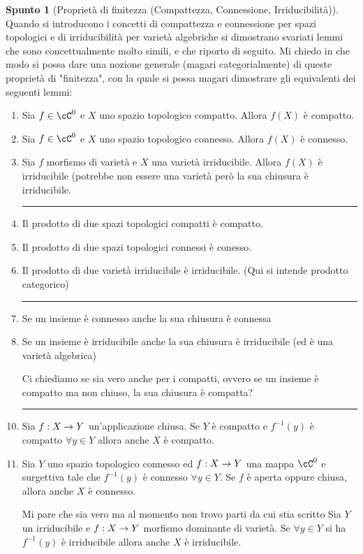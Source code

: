 \documentclass[a4paper,NoNotes,GeneralMath]{stdmdoc}
\theoremstyle{definition}
\newtheorem{spunto}{Spunto}
\begin{document}
	\begin{spunto}[Proprietà di finitezza (Compattezza, Connessione, Irriducibilità)]
		Quando si introducono i concetti di compattezza e connessione per spazi topologici e di irriducibilità per varietà algebriche si dimostrano svariati lemmi che sono concettualmente molto simili, e che riporto di seguito. Mi chiedo in che modo si possa dare una nozione generale (magari categorialmente) di queste proprietà di "finitezza", con la quale si possa magari dimostrare gli equivalenti dei seguenti lemmi: \\
		\begin{enumerate}
			\item Sia $f \in \cC^0$ e $X$ uno spazio topologico compatto. Allora $f(X)$ è compatto.
			\item Sia $f \in \cC^0$ e $X$ uno spazio topologico connesso. Allora $f(X)$ è connesso.
			\item Sia $f$ morfismo di varietà e $X$ una varietà irriducibile. Allora $f(X)$ è irriducibile (potrebbe non essere una varietà però la sua chiusura è irriducibile. \hrule
			\item Il prodotto di due spazi topologici compatti è compatto.
			\item Il prodotto di due spazi topologici connessi è conesso.
			\item Il prodotto di due varietà irriducibile è irriducibile. (Qui si intende prodotto categorico) \hrule
			\item Se un insieme è connesso anche la sua chiusura è connessa
			\item Se un insieme è irriducibile anche la sua chiusura è irriducibile (ed è una varietà algebrica)
			\item [Ci chiediamo se sia vero anche per i compatti, ovvero se un insieme è compatto ma non chiuso, la sua chiusura è compatta?] \hrule
			\item Sia $f: X \rightarrow Y$ un'applicazione chiusa. Se $Y$ è compatto e $f^{-1}(y)$ è compatto $\forall y \in Y$ allora anche $X$ è compatto.
			\item Sia $Y$ uno spazio topologico connesso ed $f: X \rightarrow Y$ una mappa $\cC^0$ e surgettiva tale che $f^{-1}(y)$ è connesso $\forall y \in Y$. Se $f$ è aperta oppure chiusa, allora anche $X$ è connesso.
			\item [Mi pare che sia vero ma al momento non trovo parti da cui stia scritto] Sia $Y$ un irriducibile e $f: X \rightarrow Y$ morfismo dominante di varietà. Se $\forall y \in Y$ si ha $f^{-1}(y)$ è irriducibile allora anche $X$ è irriducibile.

\end{enumerate}
\end{spunto}
\end{document}
